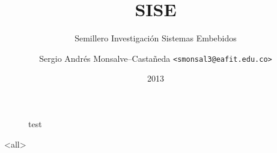\documentclass[12pt]{beamer}
\title[SISE]{SISE}
\subtitle{Semillero Investigación Sistemas Embebidos}
\author[]{Sergio Andrés Monsalve--Castañeda \texttt{<smonsal3@eafit.edu.co>}}
\institute[Universidad EAFIT]{Universidad EAFIT}
\date[Universidad EAFIT]{2013}
\begin{document}
\begin{frame}
  \begin{figure}[htp]
  	\centering
    test
  \end{figure}
\end{frame}

\begin{frame}
  \titlepage
\end{frame}

\mode<all>



\mode*

 
\end{document}
